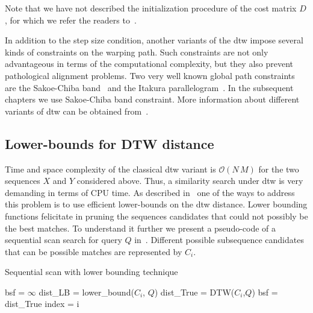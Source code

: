 Note that we have not described the initialization procedure of the cost matrix $D$, for which we refer the readers to~\citep{muller2007dynamic}.

In addition to the step size condition, another variants of the \gls{dtw} impose several kinds of constraints on the warping path. Such constraints are not only advantageous in terms of the computational complexity, but they also prevent pathological alignment problems. Two very well known global path constraints are the Sakoe-Chiba band~\citep{Sakoe78TASLP} and the Itakura parallelogram~\citep{itakura1975minimum}. In the subsequent chapters we use Sakoe-Chiba band constraint. More information about different variants of \gls{dtw} can be obtained from~\citep{rabiner1993fundamentals,muller2007dynamic}.


\subsection{Lower-bounds for DTW distance}
\label{sec:background_lowerbound}

Time and space complexity of the classical \gls{dtw} variant is $\mathcal{O}(N\,M)$ for the two sequences $X$ and $Y$ considered above. Thus, a similarity search under \gls{dtw} is very demanding in terms of CPU time. As described in~\cite{Keogh2004} one of the ways to address this problem is to use efficient lower-bounds on the \gls{dtw} distance. Lower bounding functions felicitate in pruning the sequences candidates that could not possibly be the best matches. To understand it further we present a pseudo-code of a sequential scan search for query $Q$ in~. Different possible subsequence candidates that can be possible matches are represented by $C_i$.%

\begin{algorithm}
	\caption{Sequential scan with lower bounding technique}
	\label{alg:sequential_scan_lower_bound}
	\begin{algorithmic}
		\State bsf = $\infty$	
			\State dist\_LB = lower\_bound($C_i$, $Q$)
				\State dist\_True = DTW($C_i$,$Q$)	
					\State bsf = dist\_True
					\State index = i 
				\EndIf
			\EndIf
		
		\EndFor
		
	\end{algorithmic}
\end{algorithm}

